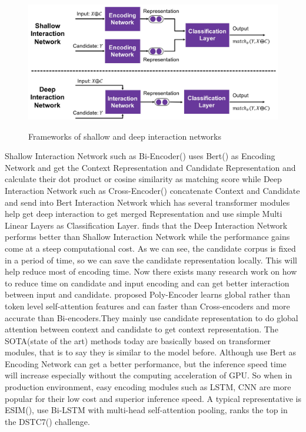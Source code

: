 \documentclass{article}
\begin{document}
\begin{figure}[htb]
\caption{Frameworks of shallow and deep interaction networks}
	\centering
	\includegraphics[width=1\linewidth]{images/Frameworks of shallow and deep interaction networks.png}
	\label{fig:fig1}
\end{figure}

Shallow Interaction Network such as Bi-Encoder(\cite{humeau2019poly}) uses Bert(\cite{devlin2018bert}) as Encoding Network and get the Context Representation and Candidate Representation and calculate their dot product or cosine similarity as matching score while Deep Interaction Network such as Cross-Encoder(\cite{humeau2019poly}) concatenate Context and Candidate and send into Bert Interaction Network which has several transformer modules help get deep interaction to get merged Representation and use simple Multi Linear Layers as Classification Layer. \cite{urbanek2019learning} finds that the Deep Interaction Network performs better than Shallow Interaction Network while the performance gains come at a steep computational cost. As we can see, the candidate corpus is fixed in a period of time, so we can save the candidate representation locally. This will help reduce most of encoding time. Now there exists many research work on how to reduce time on candidate and input encoding and can get better interaction between input and candidate. \cite{humeau2019poly} proposed Poly-Encoder learns global rather than token level self-attention features and can faster than Cross-encoders and more accurate than Bi-encoders.They mainly use candidate representation to do global attention between context and candidate to get context representation. The SOTA(state of the art) methods today are basically based on transformer modules, that is to say they is similar to the model before. Although use Bert as Encoding Network can get a better performance, but the inference speed time will increase especially without the computing acceleration of GPU. So when in production environment, easy encoding modules such as LSTM, CNN are more popular for their low cost and superior inference speed. A typical representative is ESIM(\cite{chen2019sequential}), use Bi-LSTM with multi-head self-attention pooling, ranks the top in the DSTC7(\cite{gunasekara2019dstc7}) challenge.
\end{document}

